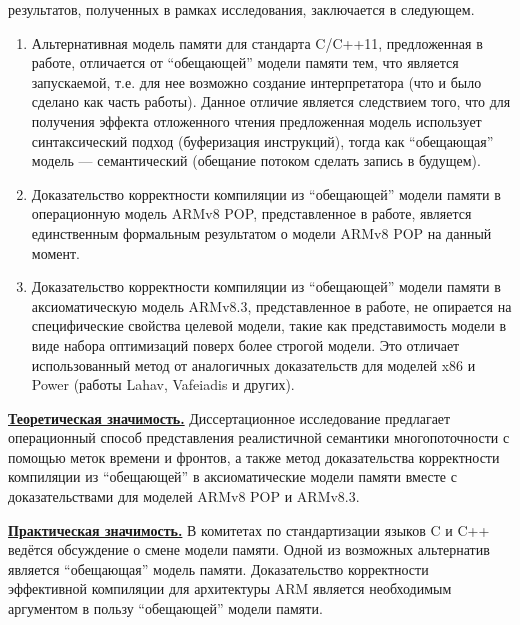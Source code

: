 {\novelty} результатов, полученных в рамках исследования, заключается в следующем.
\begin{enumerate}
  \item Альтернативная модель памяти для стандарта C/C++11, предложенная в работе, отличается от ``обещающей'' модели
  памяти тем, что является запускаемой, т.е. для нее возможно создание интерпретатора (что и было сделано как часть работы).
  Данное отличие является следствием того, что для получения эффекта отложенного чтения предложенная модель использует
  синтаксический подход (буферизация инструкций), тогда как ``обещающая'' модель --- семантический (обещание потоком сделать
  запись в будущем).
  \item Доказательство корректности компиляции из ``обещающей'' модели памяти в операционную модель ARMv8 POP, представленное
  в работе, является единственным формальным результатом о модели ARMv8 POP на данный момент.
  \item Доказательство корректности компиляции из ``обещающей'' модели памяти в аксиоматическую модель ARMv8.3, представленное
  в работе, не опирается на специфические свойства целевой модели, такие как представимость модели в виде набора оптимизаций
  поверх более строгой модели. Это отличает использованный метод от аналогичных доказательств для моделей x86 и Power
  (работы Lahav, Vafeiadis и других).
\end{enumerate}

{\underline{\textbf{Теоретическая значимость.}}} Диссертационное исследование предлагает 
операционный способ представления реалистичной семантики многопоточности с помощью меток времени и фронтов, а также
метод доказательства корректности компиляции из ``обещающей'' в аксиоматические модели памяти вместе
с доказательствами для моделей ARMv8 POP и ARMv8.3.

{\underline{\textbf{Практическая значимость.}}} В комитетах по стандартизации языков C и C++ ведётся
обсуждение о смене модели памяти. Одной из возможных альтернатив является ``обещающая'' модель памяти.
Доказательство корректности эффективной компиляции для архитектуры ARM является необходимым аргументом
в пользу ``обещающей'' модели памяти.


